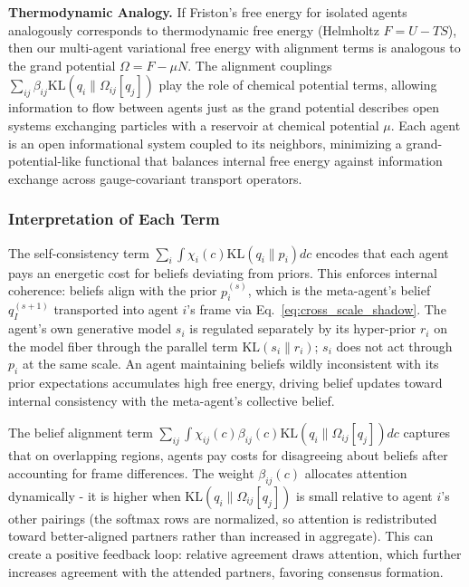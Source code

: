 \documentclass[11pt]{article}
\begin{document}
\textbf{Thermodynamic Analogy.} If Friston's free energy for isolated agents analogously corresponds to thermodynamic free energy (Helmholtz $F = U - TS$), then our multi-agent variational free energy with alignment terms is analogous to the grand potential $\Omega = F - \mu N$. The alignment couplings $\sum_{ij} \beta_{ij} \mathrm{KL}(q_i \| \Omega_{ij}[q_j])$ play the role of chemical potential terms, allowing information to flow between agents just as the grand potential describes open systems exchanging particles with a reservoir at chemical potential $\mu$. Each agent is an open informational system coupled to its neighbors, minimizing a grand-potential-like functional that balances internal free energy against information exchange across gauge-covariant transport operators.

\subsubsection{Interpretation of Each Term}

The self-consistency term $\sum_i \int \chi_i(c)  \mathrm{KL}(q_i \| p_i)  dc$ encodes that each agent pays an energetic cost for beliefs deviating from priors. This enforces internal coherence: beliefs align with the prior $p_i^{(s)}$, which is the meta-agent's belief $q_I^{(s+1)}$ transported into agent $i$'s frame via Eq.~\eqref{eq:cross_scale_shadow}. The agent's own generative model $s_i$ is regulated separately by its hyper-prior $r_i$ on the model fiber through the parallel term $\mathrm{KL}(s_i\|r_i)$; $s_i$ does not act through $p_i$ at the same scale. An agent maintaining beliefs wildly inconsistent with its prior expectations accumulates high free energy, driving belief updates toward internal consistency with the meta-agent's collective belief.

The belief alignment term $\sum_{ij} \int \chi_{ij}(c)  \beta_{ij}(c)  \mathrm{KL}(q_i \| \Omega_{ij}[q_j])  dc$ captures that on overlapping regions, agents pay costs for disagreeing about beliefs after accounting for frame differences. The weight $\beta_{ij}(c)$ allocates attention dynamically - it is higher when $\mathrm{KL}(q_i \| \Omega_{ij}[q_j])$ is small relative to agent $i$'s other pairings (the softmax rows are normalized, so attention is redistributed toward better-aligned partners rather than increased in aggregate). This can create a positive feedback loop: relative agreement draws attention, which further increases agreement with the attended partners, favoring consensus formation.
\end{document}
